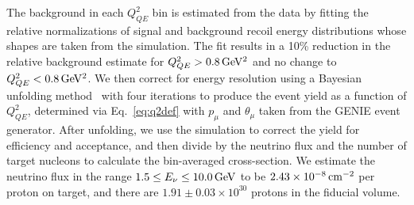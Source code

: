 
The background in each $Q^2_{QE}$ bin is estimated from 
the data by fitting the relative normalizations of signal and background 
recoil energy distributions whose shapes are taken from the simulation. 
The fit results in a 10\% reduction in the relative background estimate for 
 $Q^2_{QE}> \unit[0.8]{GeV^2}$ and no change to $Q^2_{QE} < \unit[0.8]{GeV^2}$.
We then correct for energy resolution using a Bayesian 
unfolding method~\cite{D'Agostini:1994zf} with four iterations to 
produce the event yield as a function of $Q^2_{QE}$, determined via 
Eq.~\ref{eq:q2def}  with $p_\mu$ and $\theta_\mu$ taken 
from the GENIE event generator.  
After unfolding, we use the simulation to correct the yield for efficiency and acceptance, and then divide by the neutrino flux and the number of target nucleons to calculate the bin-averaged cross-section.  We estimate the neutrino flux in the range $1.5\le E_\nu \le \unit[10.0]{GeV}$ to be $\unit[2.43 \times 10^{-8}]{cm^{-2}}$ per proton on target, and there are  $1.91 \pm 0.03 \times 10^{30}$ protons in the fiducial volume. 


